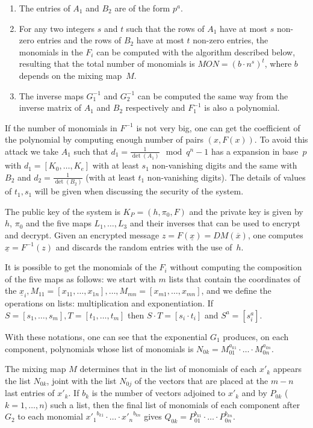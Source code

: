 \documentclass[12pt,a4paper]{amsart}
\theoremstyle{remark}
\theoremstyle{definition}
\begin{document}
\begin{enumerate}
 \item The entries of $A_1$ and $B_2$ are of the form $p^a$.
 \item For any two integers $s$ and $t$ such that the rows of $A_1$
 have at most $s$ non-zero entries and the rows of $B_2$ have at most
 $t$ non-zero entries, the monomials in the $F_i$ can be computed
 with the algorithm described below, resulting that the total number
 of monomials is $MON=(b\cdot n^s)^t$, where $b$ depends on the mixing map~$M$.
\item The inverse maps $G_1^{-1}$ and $G_2^{-1}$ can be computed the same
way from the inverse matrix of $A_1$ and $B_2$ respectively and
$F_1^{-1}$ is also a polynomial.
\end{enumerate}
If the number of monomials in $F^{-1}$ is not very big, one can get the coefficient
of the polynomial by computing enough number of pairs $(x,F(x))$. To avoid
this attack we take $A_1$ such that $d_1=\frac{1}{\det(A_1)}\mod{q^n-1}$
has a expansion in base~$p$ with $d_1=[K_0,\dots,K_e ]$ with at least $s_1$
non-vanishing digits and the same with $B_2$ and $d_2=\frac{1}{\det(B_2)}$
(with at least $t_1$ non-vanishing digits). The details of values of $t_1,s_1$
will be given when discussing the security of the system.

The public key of the system is $K_P=(h,\pi_0,F)$ and the private key is
given by $h$, $\pi_0$ and the five maps $L_1,\dots,L_3$ and their inverses
that can be used to encrypt and decrypt. Given an encrypted message 
$z=F(\underline{x})=DM(\overline{x})$, 
one computes $\underline{x}=F^{-1}(z)$ and discards the random entries
with the use of~$h$.

It is possible to get the monomials of the $F_i$ without computing the composition
of the five maps as follows: we start with $m$ lists that contain
the coordinates of the 
$\underline{x}_i, M_{11}=[x_{11},\dots,x_{1n}], \dots,M_{mn}=[x_{m1},\dots,x_{mn}]$, 
and we define the operations on lists: multiplication and exponentiation. 
If $S=[s_1,\dots,s_m], T=[t_1,\dots,t_m]$ then $S\cdot T=[s_i\cdot t_i]$ and $S^a=[s_i^a]$.

With these notations, one can see that the exponential $G_1$ produces, on each component,
polynomials whose list of monomials is $N_{0k}=M_{01}^{a_{k1}}\cdot\ldots\cdot M_{0n}^{a_{kn}}$.

The mixing map $M$ determines that in the list of monomials of each $x'_k$ appears
the list $N_{0k}$, joint with the list $N_{0j}$ of the vectors that are placed
at the $m-n$ last entries of $x'_k$. If $b_k$ is the number of vectors adjoined
to $x'_k$ and by $P_{0k}$ ($k=1,\dots,n$) such a list, then the final
list of monomials of each component after $G_2$ to each monomial ${x'_1}^{b_{k1}}\cdot\ldots\cdot{x'_n}^{b_{kn}}$ gives $Q_{0k}=P_{01}^{b_{k1}}\cdot\ldots\cdot P_{0n}^{b_{kn}}$.
\end{document}

